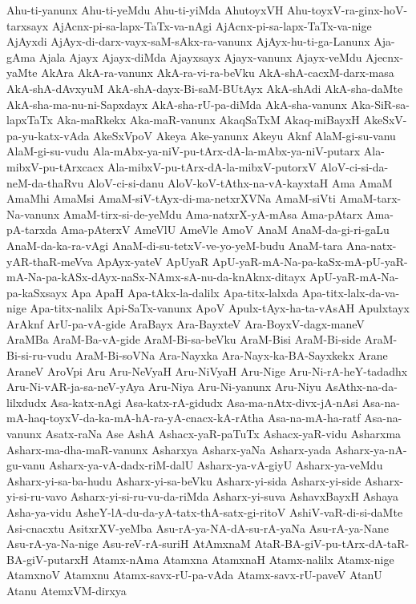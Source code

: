 {Ahu-ti-yanunx
Ahu-ti-yeMdu
Ahu-ti-yiMda
AhutoyxVH
Ahu-toyxV-ra-ginx-hoV-tarxsayx
AjAcnx-pi-sa-lapx-TaTx-va-nAgi
AjAcnx-pi-sa-lapx-TaTx-va-nige
AjAyxdi
AjAyx-di-darx-vayx-saM-sAkx-ra-vanunx
AjAyx-hu-ti-ga-Lanunx
Aja-gAma
Ajala
Ajayx
Ajayx-diMda
Ajayxsayx
Ajayx-vanunx
Ajayx-veMdu
Ajecnx-yaMte
AkAra
AkA-ra-vanunx
AkA-ra-vi-ra-beVku
AkA-shA-cacxM-darx-masa
AkA-shA-dAvxyuM
AkA-shA-dayx-Bi-saM-BUtAyx
AkA-shAdi
AkA-sha-daMte
AkA-sha-ma-nu-ni-Sapxdayx
AkA-sha-rU-pa-diMda
AkA-sha-vanunx
Aka-SiR-sa-lapxTaTx
Aka-maRkekx
Aka-maR-vanunx
AkaqSaTxM
Akaq-miBayxH
AkeSxV-pa-yu-katx-vAda
AkeSxVpoV
Akeya
Ake-yanunx
Akeyu
Aknf
AlaM-gi-su-vanu
AlaM-gi-su-vudu
Ala-mAbx-ya-niV-pu-tArx-dA-la-mAbx-ya-niV-putarx
Ala-mibxV-pu-tArxcacx
Ala-mibxV-pu-tArx-dA-la-mibxV-putorxV
AloV-ci-si-da-neM-da-thaRvu
AloV-ci-si-danu
AloV-koV-tAthx-na-vA-kayxtaH
Ama
AmaM
AmaMhi
AmaMsi
AmaM-siV-tAyx-di-ma-netxrXVNa
AmaM-siVti
AmaM-tarx-Na-vanunx
AmaM-tirx-si-de-yeMdu
Ama-natxrX-yA-mAsa
Ama-pAtarx
Ama-pA-tarxda
Ama-pAterxV
AmeVlU
AmeVle
AmoV
AnaM
AnaM-da-gi-ri-gaLu
AnaM-da-ka-ra-vAgi
AnaM-di-su-tetxV-ve-yo-yeM-budu
AnaM-tara
Ana-natx-yAR-thaR-meVva
ApAyx-yateV
ApUyaR
ApU-yaR-mA-Na-pa-kaSx-mA-pU-yaR-mA-Na-pa-kASx-dAyx-naSx-NAmx-sA-nu-da-knAknx-ditayx
ApU-yaR-mA-Na-pa-kaSxsayx
Apa
ApaH
Apa-tAkx-la-dalilx
Apa-titx-lalxda
Apa-titx-lalx-da-va-nige
Apa-titx-nalilx
Api-SaTx-vanunx
ApoV
Apulx-tAyx-ha-ta-vAsAH
Apulxtayx
ArAknf
ArU-pa-vA-gide
AraBayx
Ara-BayxteV
Ara-BoyxV-dagx-maneV
AraMBa
AraM-Ba-vA-gide
AraM-Bi-sa-beVku
AraM-Bisi
AraM-Bi-side
AraM-Bi-si-ru-vudu
AraM-Bi-soVNa
Ara-Nayxka
Ara-Nayx-ka-BA-Sayxkekx
Arane
AraneV
AroVpi
Aru
Aru-NeVyaH
Aru-NiVyaH
Aru-Nige
Aru-Ni-rA-heY-tadadhx
Aru-Ni-vAR-ja-sa-neV-yAya
Aru-Niya
Aru-Ni-yanunx
Aru-Niyu
AsAthx-na-da-lilxdudx
Asa-katx-nAgi
Asa-katx-rA-gidudx
Asa-ma-nAtx-divx-jA-nAsi
Asa-na-mA-haq-toyxV-da-ka-mA-hA-ra-yA-cnacx-kA-rAtha
Asa-na-mA-ha-ratf
Asa-na-vanunx
Asatx-raNa
Ase
AshA
Ashacx-yaR-paTuTx
Ashacx-yaR-vidu
Asharxma
Asharx-ma-dha-maR-vanunx
Asharxya
Asharx-yaNa
Asharx-yada
Asharx-ya-nA-gu-vanu
Asharx-ya-vA-dadx-riM-dalU
Asharx-ya-vA-giyU
Asharx-ya-veMdu
Asharx-yi-sa-ba-hudu
Asharx-yi-sa-beVku
Asharx-yi-sida
Asharx-yi-side
Asharx-yi-si-ru-vavo
Asharx-yi-si-ru-vu-da-riMda
Asharx-yi-suva
AshavxBayxH
Ashaya
Asha-ya-vidu
AsheY-lA-du-da-yA-tatx-thA-satx-gi-ritoV
AshiV-vaR-di-si-daMte
Asi-cnacxtu
AsitxrXV-yeMba
Asu-rA-ya-NA-dA-su-rA-yaNa
Asu-rA-ya-Nane
Asu-rA-ya-Na-nige
Asu-reV-rA-suriH
AtAmxnaM
AtaR-BA-giV-pu-tArx-dA-taR-BA-giV-putarxH
Atamx-nAma
Atamxna
AtamxnaH
Atamx-nalilx
Atamx-nige
AtamxnoV
Atamxnu
Atamx-savx-rU-pa-vAda
Atamx-savx-rU-paveV
AtanU
Atanu
AtemxVM-dirxya
}
